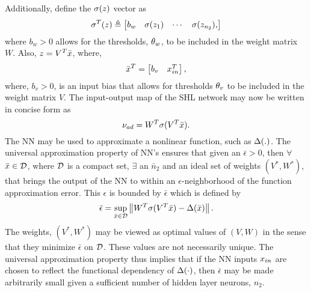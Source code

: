 %
Additionally, define the $\sigma(z)$ vector as
\begin{equation}
\sigma^T(z) \triangleq
\begin{bmatrix}
b_w    &    \sigma(z_1)  &  \cdots &  \sigma(z_{n_2}),
\end{bmatrix}
\end{equation}
where $b_w > 0$ allows for the thresholds, $\theta_w$, to be
included in the weight matrix $W$. Also, $z = V^T\bar{x}$,
where,
\begin{equation}
\bar{x}^T =
\begin{bmatrix} b_v   & x_{in}^T
\end{bmatrix},
\end{equation}
where, $b_v > 0$, is an input bias that allows for thresholds
$\theta_v$ to be included in the weight matrix $V$.
%
The input-output map of the SHL network may now be written in
concise form as
\begin{equation}
\label{e:nuad} \nu_{ad} = W^T\sigma(V^T\bar{x}).
\end{equation}
%
The NN may be used to approximate a nonlinear function, such as
$\Delta(.)$. The universal approximation property\cite{hornik_89} of
NN's ensures that given an $\bar{\epsilon} > 0$, then $\forall$
$\bar{x} \in \mathcal{D}$, where $\mathcal{D}$ is a compact set, $\exists$ an
$\bar{n}_2$ and an ideal set of weights $(V^*,W^*)$, that brings the
output of the NN to within an $\epsilon$-neighborhood of the
function approximation error. This $\epsilon$ is bounded by
$\bar{\epsilon}$ which is defined by
\begin{equation}
\bar{\epsilon} = \sup_{\bar{x} \in \mathcal{D}} \left\|
W^T\sigma(V^T\bar{x}) - \Delta(\bar{x}) \right\|.
\end{equation}
The weights, $(V^*,W^*)$ may be viewed as optimal values of $(V,W)$
in the sense that they minimize $\bar{\epsilon}$ on $\mathcal{D}$. These
values are not necessarily unique. The universal approximation
property thus implies that if the NN inputs $x_{in}$ are chosen
to reflect the functional dependency of $\Delta(\cdot)$, then
$\bar{\epsilon}$ may be made arbitrarily small given a sufficient
number of hidden layer neurons, $n_2$.

